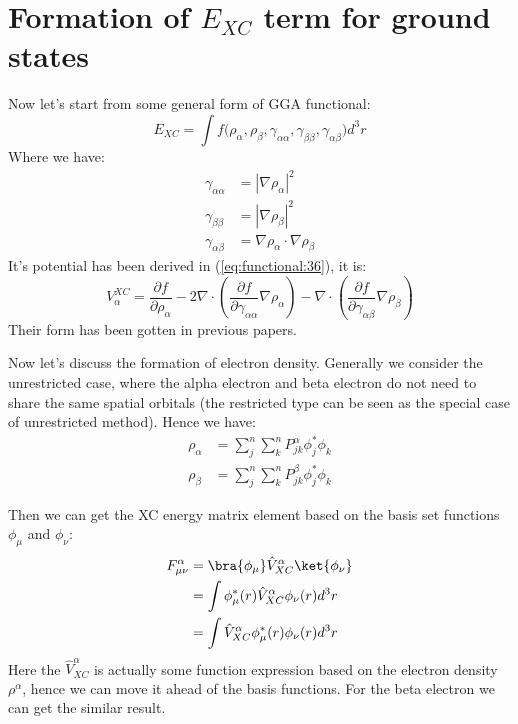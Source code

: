 \section{Formation of $E_{XC}$ term for ground states}
\label{sec:formation_XC_functional_ground}
%
%
%
%
%
Now let's start from some general form of GGA functional:
\begin{equation}
\label{eq:XC_functional.3}
  E_{XC} = \int  f \Big(\rho_{\alpha}, \rho_{\beta},
  \gamma_{\alpha\alpha}, \gamma_{\beta\beta},
 \gamma_{\alpha\beta}\Big) d^{3}r
\end{equation}
Where we have:
\begin{align}
  \gamma_{\alpha\alpha} &= |\nabla\rho_{\alpha}|^{2} \nonumber \\
  \gamma_{\beta\beta}  &= |\nabla\rho_{\beta}|^{2} \nonumber \\
  \gamma_{\alpha\beta} &=\nabla\rho_{\alpha} \cdot \nabla\rho_{\beta}
\end{align}
It's potential has been derived in (\ref{eq:functional:36}), it is:
\begin{equation}
  \label{eq:XC_functional.4}
  V_{\alpha}^{XC} = \frac{\partial f}{\partial \rho_{\alpha}} - 2\nabla\cdot \left(
    \frac{\partial f} {\partial \gamma_{\alpha\alpha}}
   \nabla\rho_{\alpha}\right) - \nabla\cdot \left( \frac{\partial f}
    {\partial \gamma_{\alpha\beta}} \nabla\rho_{\beta} \right) 
\end{equation}
Their form has been gotten in previous papers\cite{CPL_1992_6_557,johnson:5612}.

Now let's discuss the formation of electron density. Generally we
consider the unrestricted case, where the alpha electron and beta
electron do not need to share the same spatial orbitals (the
restricted type can be seen as the special case of unrestricted
method). Hence we have:
\begin{align}
  \label{eq:XC_functional.5}
  \rho_{\alpha} &=
  \sum_{j}^{n}\sum_{k}^{n}P^{\alpha}_{jk}\phi_{j}^{*}\phi_{k}
  \nonumber
  \\
  \rho_{\beta} &=
  \sum_{j}^{n}\sum_{k}^{n}P^{\beta}_{jk}\phi_{j}^{*}\phi_{k}
\end{align}

Then we can get the XC energy matrix element based on the basis set
functions $\phi_{\mu}$ and $\phi_{\nu}$:
\begin{align}
  \label{eq:XC_functional.6}
  F^{\alpha}_{\mu\nu} &=
 \bra{\phi_{\mu}}\hat{V}^{\alpha}_{XC}\ket{\phi_{\nu}} \nonumber \\
  &= \int\phi^{*}_{\mu}(r)\hat{V}^{\alpha}_{XC}\phi_{\nu}(r) d^{3}r
  \nonumber \\
  &= \int\hat{V}^{\alpha}_{XC}\phi^{*}_{\mu}(r)\phi_{\nu}(r) d^{3}r
\end{align}
Here the $\hat{V}^{\alpha}_{XC}$ is actually some function expression based on
the electron density $\rho^{\alpha}$, hence we can move it ahead of
the basis functions. For the beta electron we can get the similar result.

